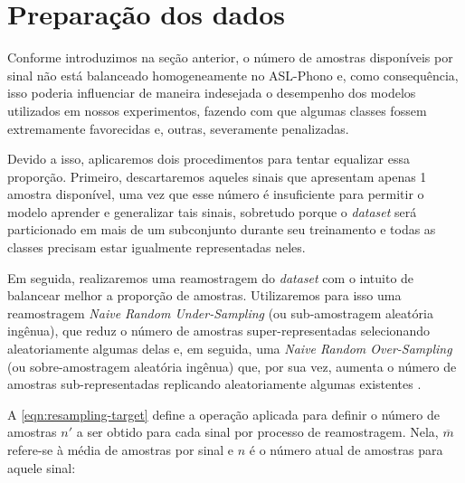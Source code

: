 \section{Preparação dos dados}
\label{sec:metodologia-preparacao-dataset}


Conforme introduzimos na seção anterior, o número de amostras disponíveis por sinal não está balanceado homogeneamente no ASL-Phono e, como consequência, isso poderia influenciar de maneira indesejada o desempenho dos modelos utilizados em nossos experimentos, fazendo com que algumas classes fossem extremamente favorecidas e, outras, severamente penalizadas.


Devido a isso, aplicaremos dois procedimentos para tentar equalizar essa proporção. Primeiro, descartaremos aqueles sinais que apresentam apenas 1 amostra disponível, uma vez que esse número é insuficiente para permitir o modelo aprender e generalizar tais sinais, sobretudo porque o \textit{dataset} será particionado em mais de um subconjunto durante seu treinamento e todas as classes precisam estar igualmente representadas neles.

Em seguida, realizaremos uma reamostragem do \textit{dataset} com o intuito de balancear melhor a proporção de amostras.
Utilizaremos para isso uma reamostragem \textit{Naive Random Under-Sampling} (ou sub-amostragem aleatória ingênua), que reduz o número de amostras super-representadas selecionando aleatoriamente algumas delas e, em seguida, uma \textit{Naive Random Over-Sampling} (ou sobre-amostragem aleatória ingênua) que, por sua vez, aumenta o número de amostras sub-representadas replicando aleatoriamente algumas existentes \cite{he-2013-imbalanced}.

A \autoref{eqn:resampling-target} define a operação aplicada para definir o número de amostras \(n'\) a ser obtido para cada sinal por processo de reamostragem. Nela, \(\overline{m}\) refere-se à média de amostras por sinal e \(n\) é o número atual de amostras para aquele sinal:

